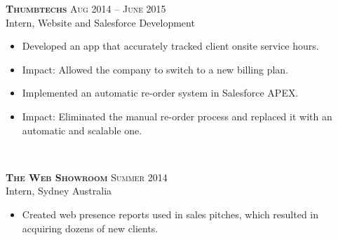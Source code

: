 \documentclass[10pt]{article} %
\begin{document}
{\raggedright

\large \textsc{\textbf{Thumbtechs}} \hfill \small{\textsc{Aug 2014 -- June 2015}}\\
Intern, Website and Salesforce Development}
\normalsize{
\begin{itemize}
\item Developed an app that accurately tracked client onsite service hours.
\item Impact: Allowed the company to switch to a new billing plan.
\item Implemented an automatic re-order system in Salesforce APEX.
\item Impact: Eliminated the manual re-order process and replaced it with an automatic and scalable one.
\end{itemize}
}\\
\hfill

{\raggedright \large \textsc{\textbf{The Web Showroom}} \hfill \small{\textsc{Summer 2014}}\\
Intern, Sydney Australia}
\normalsize{
\begin{itemize}
\item Created web presence reports used in sales pitches, which resulted in acquiring dozens of new clients.
\end{itemize}
}\\
\hfill

\end{document}
